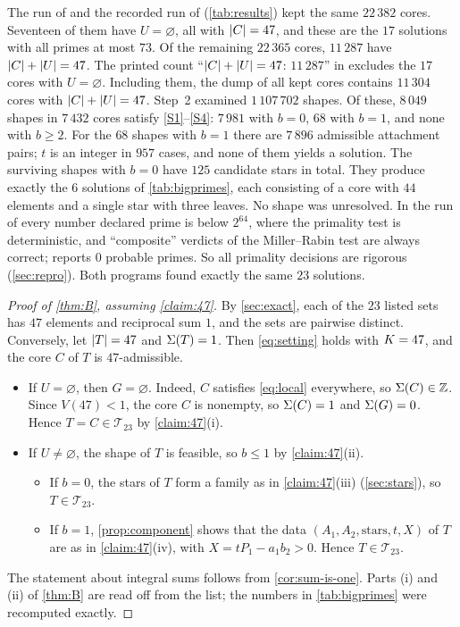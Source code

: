 \documentclass[11pt]{article}
\begin{document}
The run of  and the recorded run of  (\cref{tab:results}) kept the same $22\,382$ cores. Seventeen of them have $U=\varnothing$, all with $\lvert C\rvert=47$, and these are the $17$ solutions with all primes at most $73$.
Of the remaining $22\,365$ cores, $11\,287$ have $\lvert C\rvert+\lvert U\rvert=47$.
The printed count ``$\lvert C\rvert+\lvert U\rvert=47$: $11\,287$'' in  excludes the $17$ cores with $U=\varnothing$. Including them, the dump of all kept cores contains $11\,304$ cores with $\lvert C\rvert+\lvert U\rvert=47$.
Step~2 examined $1\,107\,702$ shapes. Of these, $8\,049$ shapes in $7\,432$ cores satisfy \ref{S1}--\ref{S4}: $7\,981$ with $b=0$, $68$ with $b=1$, and none with $b\ge2$.
For the $68$ shapes with $b=1$ there are $7\,896$ admissible attachment pairs; $t$ is an integer in $957$ cases, and none of them yields a solution.
The surviving shapes with $b=0$ have $125$ candidate stars in total. They produce exactly the $6$ solutions of \cref{tab:bigprimes}, each consisting of a core with $44$ elements and a single star with three leaves.
No shape was unresolved. In the run of  every number declared prime is below $2^{64}$, where the primality test is deterministic, and ``composite'' verdicts of the Miller--Rabin test are always correct;  reports $0$ probable primes. So all primality decisions are rigorous (\cref{sec:repro}).
Both programs found exactly the same $23$ solutions.

\begin{proof}[Proof of \cref{thm:B}, assuming \cref{claim:47}]
By \cref{sec:exact}, each of the $23$ listed sets has $47$ elements and reciprocal sum $1$, and the sets are pairwise distinct.
Conversely, let $\lvert T\rvert=47$ and $\Sigma(T)=1$. Then \eqref{eq:setting} holds with $K=47$, and the core $C$ of $T$ is $47$-admissible.
\begin{itemize}
\item If $U=\varnothing$, then $G=\varnothing$. Indeed, $C$ satisfies \eqref{eq:local} everywhere, so $\Sigma(C)\in\mathbb{Z}$. Since $V(47)<1$, the core $C$ is nonempty, so $\Sigma(C)=1$ and $\Sigma(G)=0$. Hence $T=C\in\mathcal{T}_{23}$ by \cref{claim:47}(i).
\item If $U\ne\varnothing$, the shape of $T$ is feasible, so $b\le1$ by \cref{claim:47}(ii).
  \begin{itemize}
  \item If $b=0$, the stars of $T$ form a family as in \cref{claim:47}(iii) (\cref{sec:stars}), so $T\in\mathcal{T}_{23}$.
  \item If $b=1$, \cref{prop:component} shows that the data $(A_1,A_2,\text{stars},t,X)$ of $T$ are as in \cref{claim:47}(iv), with $X=tP_1-a_1b_2>0$. Hence $T\in\mathcal{T}_{23}$.
  \end{itemize}
\end{itemize}
The statement about integral sums follows from \cref{cor:sum-is-one}. Parts (i) and (ii) of \cref{thm:B} are read off from the list; the numbers in \cref{tab:bigprimes} were recomputed exactly.
\end{proof}
\end{document}
